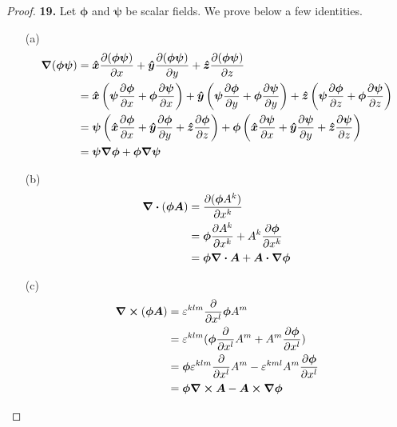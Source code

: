 \documentclass[11pt]{article}
\newcommand{\hatx}{\bm{\hat{x}}}
\newcommand{\haty}{\bm{\hat{y}}}
\newcommand{\hatz}{\bm{\hat{z}}}
\theoremstyle{definition}
\begin{document}
\begin{proof}{\textbf{19.}} Let $\bm\phi$ and $\bm\psi$ be scalar fields.
We prove below a few identities.
\begin{itemize}
    \item [(a)]
    \begin{align*}
        \grad(\bm\phi\bm\psi) &=
        \hatx \partialderivative{(\bm\phi\bm\psi)}{x}
        + \haty \partialderivative{(\bm\phi\bm\psi)}{y}
        + \hatz \partialderivative{(\bm\phi\bm\psi)}{z}\\
        &=
        \hatx \left(\bm\psi\partialderivative{\bm\phi}{x}
        + \bm\phi\partialderivative{\bm\psi}{x}\right)
        + \haty \left(\bm\psi\partialderivative{\bm\phi}{y}
        + \bm\phi\partialderivative{\bm\psi}{y}\right)
        + \hatz \left(\bm\psi\partialderivative{\bm\phi}{z}
        + \bm\phi\partialderivative{\bm\psi}{z}\right)\\
        &=
        \bm\psi\left(\hatx \partialderivative{\bm\phi}{x}
        + \haty\partialderivative{\bm\phi}{y}
        + \hatz\partialderivative{\bm\phi}{z}\right)
        + \bm\phi\left(\hatx\partialderivative{\bm\psi}{x}
        + \haty\partialderivative{\bm\psi}{y}
        + \hatz\partialderivative{\bm\psi}{z}\right)\\
        &= \bm\psi\grad\bm\phi + \bm\phi\grad\bm\psi
    \end{align*}
    \item [(b)]
    \begin{align*}
        \div(\bm\phi\bm A) &= \partialderivative{(\bm\phi A^k)}{x^k}\\
            &= \bm\phi\partialderivative{A^k}{x^k} + A^k\partialderivative{\bm\phi}{x^k}\\
            &= \bm\phi \div\bm A + \bm{A \cdot} \gradient\bm\phi
    \end{align*}
\cleardoublepage
    \item [(c)]
    \begin{align*}
        \curl{(\bm{\phi}\bm{A})}
        &= \varepsilon^{klm}\partialderivative{}{x^l}\bm\phi A^m\\
        &= \varepsilon^{klm}
        (\bm\phi\partialderivative{}{x^l}A^m + A^m\partialderivative{\bm\phi}{x^l})\\
        &= \bm\phi \varepsilon^{klm}\partialderivative{}{x^l}A^m
        - \varepsilon^{kml}A^m\partialderivative{\bm\phi}{x^l}\\
        &= \bm\phi\curl\bm{A} - \bm{A \times }\grad\bm{\phi}
    \end{align*}
\end{itemize}
\end{proof}
\end{document}
